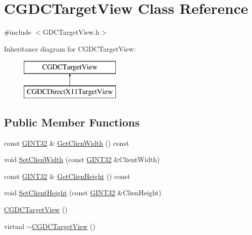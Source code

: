 \hypertarget{class_c_g_d_c_target_view}{}\section{C\+G\+D\+C\+Target\+View Class Reference}
\label{class_c_g_d_c_target_view}


{\ttfamily \#include $<$G\+D\+C\+Target\+View.\+h$>$}

Inheritance diagram for C\+G\+D\+C\+Target\+View\+:\begin{figure}[H]
\begin{center}
\leavevmode
\includegraphics[height=2.000000cm]{class_c_g_d_c_target_view}
\end{center}
\end{figure}
\subsection*{Public Member Functions}
\begin{DoxyCompactItemize}
\item 
const \hyperlink{_g_types_8h_a40d8bc7c06b9e72906852691a4bf888e}{G\+I\+N\+T32} \& \hyperlink{class_c_g_d_c_target_view_a4732a9b3832cab2aa0883d72abbd5bb2}{Get\+Clien\+Width} () const 
\item 
void \hyperlink{class_c_g_d_c_target_view_ad645aaa0a3032f93c962d5523f1ea213}{Set\+Clien\+Width} (const \hyperlink{_g_types_8h_a40d8bc7c06b9e72906852691a4bf888e}{G\+I\+N\+T32} \&Client\+Width)
\item 
const \hyperlink{_g_types_8h_a40d8bc7c06b9e72906852691a4bf888e}{G\+I\+N\+T32} \& \hyperlink{class_c_g_d_c_target_view_a301cfb017335faf74bdc427389ac21ac}{Get\+Clien\+Height} () const 
\item 
void \hyperlink{class_c_g_d_c_target_view_a014e0252c4d153c5125f46f82dd3e1f9}{Set\+Client\+Height} (const \hyperlink{_g_types_8h_a40d8bc7c06b9e72906852691a4bf888e}{G\+I\+N\+T32} \&Clien\+Height)
\item 
\hyperlink{class_c_g_d_c_target_view_aab58896b9a634e36c764459a71c39ae8}{C\+G\+D\+C\+Target\+View} ()
\item 
virtual \hyperlink{class_c_g_d_c_target_view_a10c3ef43930ef585afeeaa277e1eafb8}{$\sim$\+C\+G\+D\+C\+Target\+View} ()
\end{DoxyCompactItemize}
